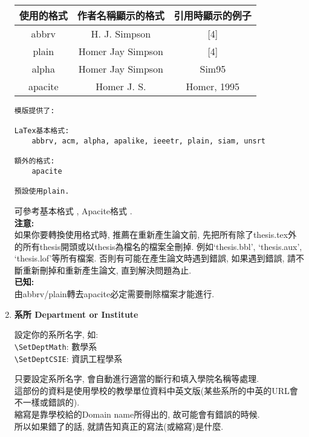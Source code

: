 \begin{enumerate}
{  \InsertTable
    {
        \begin{tabular}{|c|c|c|}
        \hline
        使用的格式   & 作者名稱顯示的格式         & 引用時顯示的例子    \\ \hline
        abbrv   & H. J. Simpson     & {[}4{]}     \\ \hline
        plain   & Homer Jay Simpson & {[}4{]}     \\ \hline
        alpha   & Homer Jay Simpson & Sim95       \\ \hline
        apacite & Homer J. S.       & Homer, 1995 \\ \hline
        \end{tabular}
    }

    \begin{DescriptionFrame}
    \begin{verbatim}
模版提供了:

LaTex基本格式:
    abbrv, acm, alpha, apalike, ieeetr, plain, siam, unsrt

額外的格式:
    apacite

預設使用plain.
    \end{verbatim}
    \end{DescriptionFrame}

   可參考基本格式 , Apacite格式 .\\

 \textbf{注意:}\\
如果你要轉換使用格式時, 推薦在重新產生論文前, 先把所有除了thesis.tex外的所有thesis開頭或以thesis為檔名的檔案全刪掉. 例如`thesis.bbl', `thesis.aux', `thesis.lof'等所有檔案.  否則有可能在產生論文時遇到錯誤, 如果遇到錯誤, 請不斷重新刪掉和重新產生論文, 直到解決問題為止.\\

 \textbf{已知:}\\
由abbrv/plain轉去apacite必定需要刪除檔案才能進行.
  } %

  \newpage
  \item
  {
    \textbf{系所 Department or Institute}

    設定你的系所名字, 如:\\
    \verb|\SetDeptMath|: 數學系\\
    \verb|\SetDeptCSIE|: 資訊工程學系

    只要設定系所名字, 會自動進行適當的斷行和填入學院名稱等處理.\\

    這部份的資料是使用學校的教學單位資料中英文版(某些系所的中英的URL會不一樣或錯誤的).\\
    縮寫是靠學校給的Domain name所得出的, 故可能會有錯誤的時候.\\
    所以如果錯了的話, 就請告知真正的寫法(或縮寫)是什麼.\\

}
\end{enumerate}

